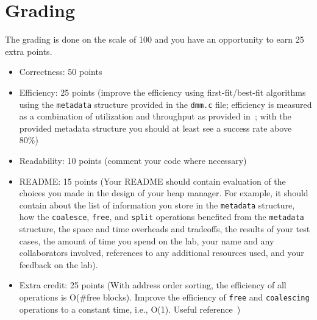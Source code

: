 \documentclass[a4paper,10pt]{article}
\begin{document}
\section{Grading}
\label{sec:grading}
The grading is done on the scale of 100 and you have an opportunity to earn 25 extra points.
\begin{itemize}
 \item Correctness: 50 points
 \item Efficiency:  25 points (improve the efficiency using first-fit/best-fit algorithms using the \texttt{metadata} structure provided in the \texttt{dmm.c} file; 
			      efficiency is measured as a combination of utilization and throughput as provided in~\cite{Bryant}; with the provided metadata structure
			      you should at least see a success rate above 80\%)
 \item Readability: 10 points (comment your code where necessary)
 \item README:	    15 points (Your README should contain evaluation of the choices you made in the design of your heap manager.
			      For example, it should contain about the list of information you store in the \texttt{metadata} structure,
			      how the \texttt{coalesce}, \texttt{free}, and \texttt{split} operations benefited from the \texttt{metadata} structure,
			      the space and time overheads and tradeoffs, the results of your test cases, the amount of time you spend on the lab,
			      your name and any collaborators involved, references to any additional resources used, and your feedback on the lab).
			     
 \item Extra credit: 25 points (With address order sorting, the efficiency of all operations is O(\#free blocks). Improve the efficiency of 
			      \texttt{free} and \texttt{coalescing} operations to a constant time, i.e., O(1). Useful reference~\cite{Bryant})

\end{itemize}



\end{document}

